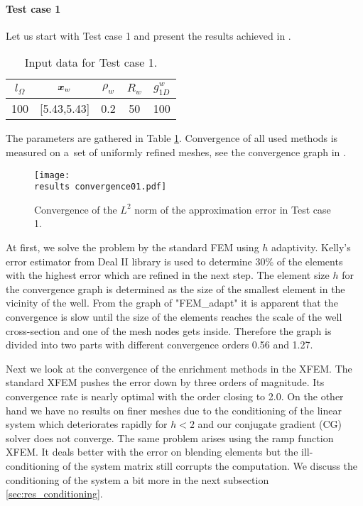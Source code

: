 \paragraph{Test case 1}
Let us start with Test case 1 and present the results achieved in \cite{exner_2016}.
%
\begin{table}[!htb]
\begin{center}
\begin{tabular}{ccccc}
\toprule
$l_\Omega$ & $\mathbf{\boldsymbol{x}}_w$  & $\rho_w$ & $R_w$ & $g^w_{1D}$\\
\midrule
100 & [5.43,5.43] & 0.2 & 50 & 100 \\
\bottomrule
\end{tabular}
\caption{Input data for Test case 1.}
\label{tab:test_case_1_data}
\end{center}
\end{table}
%
The parameters are gathered in Table \ref{tab:test_case_1_data}.
Convergence of all used methods is measured on a~set of uniformly refined meshes, 
see the convergence graph in .
%
\begin{figure}[!htb]
  \centering    
  \texttt{[image: \\results convergence01.pdf]}
  \caption[Convergence graph in Test case 1]{Convergence of the $L^2$ norm of the approximation error in Test case 1.}
  \label{fig:convergence01}
\end{figure}
%
At first, we solve the problem by the standard FEM using $h$ adaptivity.
Kelly's error estimator from Deal II library is used to determine 30\% of the elements
with the highest error which are refined in the next step.
The element size $h$ for the convergence graph is determined as the size of the smallest element in the 
vicinity of the well.
From the graph of "FEM\_adapt" it is apparent that the convergence is slow until the size of the elements reaches the scale of the
well cross-section and one of the mesh nodes gets inside. 
Therefore the graph is divided into two parts with different convergence orders 0.56 and 1.27.

Next we look at the convergence of the enrichment methods in the XFEM.
The standard XFEM pushes the error down by three orders of magnitude. Its convergence rate is nearly optimal with the order closing to 2.0.
On the other hand we have no results on finer meshes due to the conditioning of the linear system
which deteriorates rapidly for $h<2$ and our conjugate gradient (CG) solver does not converge.
The same problem arises using the ramp function XFEM. It deals better with the error on blending elements but the
ill-conditioning of the system matrix still corrupts the computation. We discuss the conditioning of the system 
a bit more in the next subsection \ref{sec:res_conditioning}.

